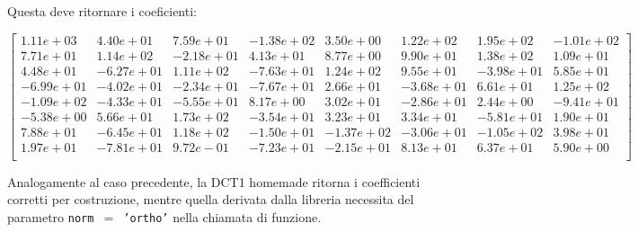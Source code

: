 Questa deve ritornare i coeficienti:
\begin{center}
	{\small
	\hspace*{-1.5cm}
		$
		\begin{bmatrix}
			1.11e+03 & 4.40e+01 & 7.59e+01 & -1.38e+02 & 3.50e+00 & 1.22e+02 & 1.95e+02 & -1.01e+02 \\
			7.71e+01 & 1.14e+02 & -2.18e+01 & 4.13e+01 & 8.77e+00 & 9.90e+01 & 1.38e+02 & 1.09e+01 \\
			4.48e+01 & -6.27e+01 & 1.11e+02 & -7.63e+01 & 1.24e+02 & 9.55e+01 & -3.98e+01 & 5.85e+01 \\
			-6.99e+01 & -4.02e+01 & -2.34e+01 & -7.67e+01 & 2.66e+01 & -3.68e+01 & 6.61e+01 & 1.25e+02 \\
			-1.09e+02 & -4.33e+01 & -5.55e+01 & 8.17e+00 & 3.02e+01 & -2.86e+01 & 2.44e+00 & -9.41e+01 \\
			-5.38e+00 & 5.66e+01 & 1.73e+02 & -3.54e+01 & 3.23e+01 & 3.34e+01 & -5.81e+01 & 1.90e+01 \\ 
			7.88e+01 & -6.45e+01 & 1.18e+02 & -1.50e+01 & -1.37e+02 & -3.06e+01 & -1.05e+02 & 3.98e+01 \\
			1.97e+01 & -7.81e+01 & 9.72e-01 & -7.23e+01 & -2.15e+01 & 8.13e+01 & 6.37e+01 & 5.90e+00 \\
		\end{bmatrix}
		$
	}
\end{center}

Analogamente al caso precedente, la DCT1 homemade ritorna i coefficienti corretti per costruzione, mentre quella derivata dalla libreria necessita del parametro \texttt{norm $=$ 'ortho'} nella chiamata di funzione.

